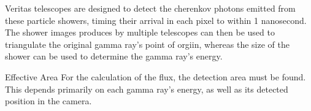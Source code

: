 Veritas telescopes are designed to detect the cherenkov photons emitted from these particle showers, timing their arrival in each pixel to within 1 nanosecond.
The shower images produces by multiple telescopes can then be used to triangulate the original gamma ray's point of orgiin, whereas the size of the shower can be used to determine the gamma ray's energy.


Effective Area
For the calculation of the flux, the detection area must be found.
This depends primarily on each gamma ray's energy, as well as its detected position in the camera.

